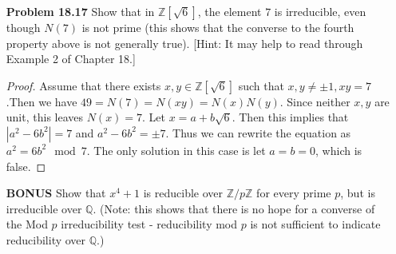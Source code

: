 \documentclass[11pt, oneside]{article}
\newcommand{\Z}{\mathbb Z}
\newcommand{\Q}{\mathbb Q}
\begin{document}
\begin{enumerate}
\begin{proof}
To show that $1+3\sqrt{-5}$ is not prime, we observe that $(1+3\sqrt{-5})(1-3\sqrt{-5})=46=2*23$. Assume that $1+3\sqrt{-5}$ is prime, then by definition we know that $1+3\sqrt{-5}$ divides $2$. Then $(1+3\sqrt{-5})(a+b\sqrt{5})=(a-15b)+(3a+b)\sqrt{5}=2$. Thus it asks $a-15b=2$ and $3a+b=0$ which is impossible. Thus $1+3\sqrt{-5}$ is not prime.
\end{proof}
\newpage
\item[{\bf Problem 18.17}]  Show that in $\Z[\sqrt{6}]$, the element $7$ is irreducible, even though $N(7)$ is not prime (this shows that the converse to the fourth property above is not generally true). [Hint: It may help to read through Example 2 of Chapter 18.]
\begin{proof}
Assume that there exists $x,y\in \Z[\sqrt{6}]$ such that $x,y\neq \pm 1, xy=7$.Then we have $49=N(7)=N(xy)=N(x)N(y)$. Since neither $x,y$ are unit, this leaves $N(x)=7$. Let $x=a+b\sqrt{6}$. Then this implies that $|a^2-6b^2|=7$ and $a^2-6b^2=\pm 7$. Thus we can rewrite the equation as $a^2=6b^2\mod 7$. The only solution in this case is let $a=b=0$, which is false.
\end{proof}
\hrulefill

\item[{\bf BONUS}] Show that $x^4+1$ is reducible over $\Z/p\Z$ for every prime $p$, but is irreducible over $\Q$. (Note: this shows that there is no hope for a converse of the Mod $p$ irreducibility test - reducibility mod $p$ is not sufficient to indicate reducibility over $\Q$.)



\end{enumerate}
\end{document}
